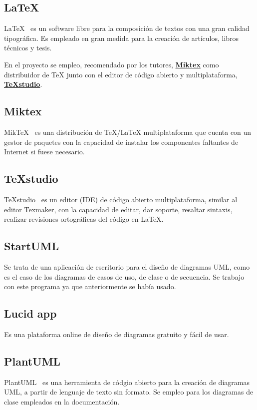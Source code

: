\subsection{LaTeX}
LaTeX~\cite{pagina_latex} es un software libre para la composición de textos con una gran calidad tipográfica. Es empleado en gran medida para la creación de artículos, libros técnicos y tesis. 

En el proyecto se empleo, recomendado por los tutores, \textbf{\href{https://miktex.org/}{Miktex}} como distribuidor de TeX junto con el editor de código abierto y multiplataforma, \textbf{\href{https://www.texstudio.org/}{TeXstudio}}. 

\subsection{Miktex} 
MikTeX~\cite{pagina_miktex} es una distribución de TeX/LaTeX multiplataforma que cuenta con un gestor de paquetes con la capacidad de instalar los componentes faltantes de Internet si fuese necesario.

\subsection{TeXstudio}
TeXstudio~\cite{pagina_texstudio} es un editor (IDE) de código abierto multiplataforma, similar al editor Texmaker, con la capacidad de editar, dar soporte, resaltar sintaxis, realizar revisiones ortográficas del código en LaTeX.

\subsection{StartUML}
Se trata de una aplicación de escritorio para el diseño de diagramas UML, como es el caso de los diagramas de casos de uso, de clase o de secuencia. Se trabajo con este programa ya que anteriormente se había usado.

\subsection{Lucid app}
Es una plataforma online de diseño de diagramas gratuito y fácil de usar.

\subsection{PlantUML}
PlantUML~\cite{pagina_PlantUML} es una herramienta de códgio abierto para la creación de diagramas UML, a partir de lenguaje de texto sin formato. Se empleo para los diagramas de clase empleados en la documentación.

